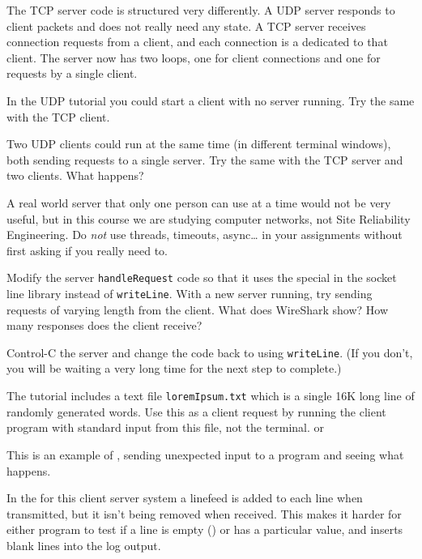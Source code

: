 The TCP server code is structured very differently. A UDP server responds
to client packets and does not really need any state. A TCP server receives
connection requests from a client, and each connection is a 
dedicated to that client. The server now has two loops, one for client connections
and one for requests by a single client.



In the UDP tutorial you could start a client with no server running. Try the
same with the TCP client.

Two UDP clients could run at the same time (in different terminal windows),
both sending requests to a single server. Try the same with the TCP server
and two clients. What happens?

\begin{IMPORTANT}
A real world server that only one person can use at a time would not be very
useful, but in this course we are studying computer networks, not Site
Reliability Engineering. Do \emph{not} use threads, timeouts, async\ldots
in your assignments without first asking if you really need to.
\end{IMPORTANT}

\STEP Modify the server \texttt{handleRequest} code so that it uses the special
 in the socket line library instead of \texttt{writeLine}.
With a new server running, try sending requests of varying length from the
client. What does WireShark show? How many responses does the client receive?

Control-C the server and change the code back to using \texttt{writeLine}.
(If you don't, you will be waiting a very long time for the next step to
complete.)

\STEP The tutorial includes a text file \texttt{loremIpsum.txt} which is a
single 16K long line of randomly generated words. Use this as a client
request by running the client program with standard input from this file,
not the terminal.
or

\begin{IMPORTANT}
This is an example of , sending unexpected input to a program
and seeing what happens.
\end{IMPORTANT}



\STEP
In the  for this client server system a linefeed is added to
each line when transmitted, but it isn't being removed when received. This
makes it harder for either program to test if a line is  empty (\DQ{}) or
has a particular value, and inserts blank lines into the log output.

